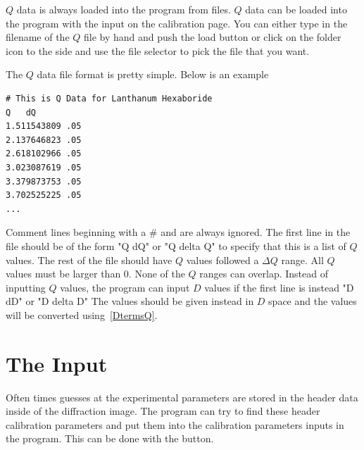 $Q$ data is always loaded into the program from files. 
$Q$ data can be loaded into the program with the 
input on the calibration page. 
You can either type in the filename of the $Q$ file by hand 
and push the load button or click on the folder icon to the 
side and use the file selector to pick the file that you want.

The $Q$ data file format is pretty simple. Below is an example 
\begin{lstlisting}[caption={Lanthanum Hexaboride.dat},label=LaB6]
# This is Q Data for Lanthanum Hexaboride
Q   dQ
1.511543809 .05
2.137646823 .05
2.618102966 .05
3.023087619 .05
3.379873753 .05
3.702525225 .05
...
\end{lstlisting}
Comment lines beginning with a \# and are always ignored. The
first line in the file should be of the form "Q  dQ" or "Q  delta Q" 
to specify that this is a list of $Q$ values. The rest of the
file should have $Q$ values followed a $\Delta Q$ range.
All $Q$ values must be larger than 0. None of the $Q$ ranges can 
overlap. Instead of inputting $Q$ values, the program can input
$D$ values if the first line is instead "D dD" or "D delta D"
The values should be given instead in $D$ space and the values
will be converted using~\ref{DtermsQ}.

\section{\texorpdfstring{The  Input}
    {The ''Get From Header Input''}}

Often times guesses at the experimental parameters are 
stored in the header data inside of the diffraction image. 
The program can try to find these header calibration parameters
and put them into the calibration parameters inputs in the 
program. This can be done with the  
button.




